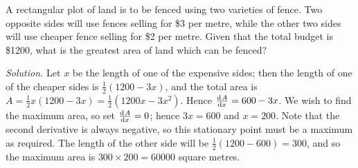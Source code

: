 \begin{ex}
  A rectangular plot of land is to be fenced using two varieties of fence. Two opposite sides will
  use fences selling for \$3 per metre, while the other two sides will use cheaper fence selling for \$2 per metre.
  Given that the total budget is \$1200, what is the greatest area of land which can be fenced?

  \textit{Solution.} Let $ x $ be the length of one of the expensive sides; then the length of one of the cheaper
                    sides is $ \frac{1}{2}(1200 - 3x) $, and the total area is $ A = \frac{1}{2} x (1200 - 3x) = \frac{1}{2}(1200x - 3x^2) $.
                    Hence $ \od{A}{x} = 600 - 3x $. We wish to find the maximum area, so set $ \od{A}{x} = 0 $; hence $ 3x = 600 $ and $ x = 200 $.
                    Note that the second derivative is always negative, so this stationary point must be a maximum as required. The length
                    of the other side will be $ \frac{1}{2}(1200 - 600) = 300 $, and so the maximum area is $ 300 \times 200 = 60000 $ square metres.
\end{ex}

